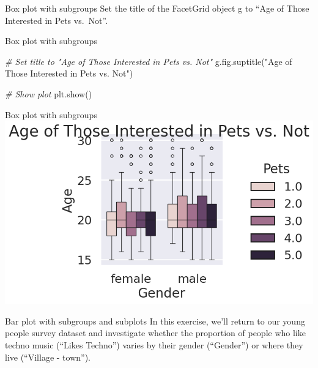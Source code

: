 \documentclass[
  ignorenonframetext,
]{beamer}
\newenvironment{Shaded}{\begin{snugshade}}{\end{snugshade}}
\newcommand{\CommentTok}[1]{\textcolor[rgb]{0.56,0.35,0.01}{\textit{#1}}}
\newcommand{\NormalTok}[1]{#1}
\newcommand{\StringTok}[1]{\textcolor[rgb]{0.31,0.60,0.02}{#1}}
\begin{document}
\begin{frame}{Box plot with subgroups}
\label{box-plot-with-subgroups-7}
Set the title of the FacetGrid object g to ``Age of Those Interested in
Pets vs.~Not''.
\end{frame}

\begin{frame}[fragile]{Box plot with subgroups}
\label{box-plot-with-subgroups-8}

\begin{Shaded}
\begin{Highlighting}[]
\CommentTok{\# Set title to "Age of Those Interested in Pets vs. Not"}
\NormalTok{g.fig.suptitle(}\StringTok{"Age of Those Interested in Pets vs. Not"}\NormalTok{)}

\CommentTok{\# Show plot}
\NormalTok{plt.show()}
\end{Highlighting}
\end{Shaded}
\end{frame}

\begin{frame}{Box plot with subgroups}
\label{box-plot-with-subgroups-9}
\includegraphics{../images/im310.png}
\end{frame}

\begin{frame}{Bar plot with subgroups and subplots}
\label{bar-plot-with-subgroups-and-subplots}
In this exercise, we'll return to our young people survey dataset and
investigate whether the proportion of people who like techno music
(``Likes Techno'') varies by their gender (``Gender'') or where they
live (``Village - town'').
\end{frame}
\end{document}
